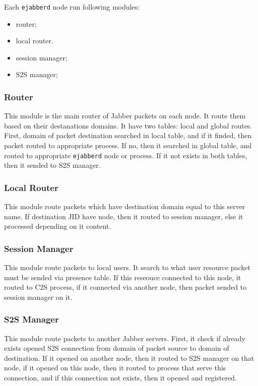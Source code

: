 \documentclass[10pt]{article}
\newcommand{\ejabberd}{\texttt{ejabberd}}
\newcommand{\Jabber}{Jabber}
\begin{document}
Each \ejabberd{} node run following modules:
\begin{itemize}
\item router;
\item local router.
\item session manager;
\item S2S manager;
\end{itemize}


\subsubsection{Router}

This module is the main router of \Jabber{} packets on each node.  It route
them based on their destanations domains.  It have two tables: local and global
routes.  First, domain of packet destination searched in local table, and if it
finded, then packet routed to appropriate process.  If no, then it searched in
global table, and routed to appropriate \ejabberd{} node or process.  If it not
exists in both tables, then it sended to S2S manager.


\subsubsection{Local Router}

This module route packets which have destination domain equal to this server
name.  If destination JID have node, then it routed to session manager, else it
processed depending on it content.


\subsubsection{Session Manager}

This module route packets to local users.  It search to what user resource
packet must be sended via presence table.  If this reseouce connected to this
node, it routed to C2S process, if it connected via another node, then packet
sended to session manager on it.


\subsubsection{S2S Manager}

This module route packets to another \Jabber{} servers.  First, it check if
already exists opened S2S connection from domain of packet source to domain of
destination.  If it opened on another node, then it routed to S2S manager on
that node, if it opened on this node, then it routed to process that serve this
connection, and if this connection not exists, then it opened and registered.
\end{document}
